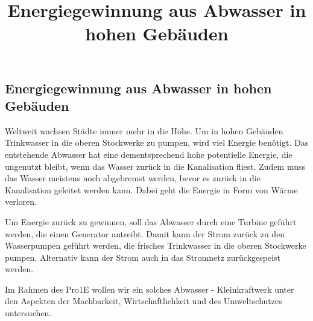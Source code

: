 \documentclass[12pt]{article}
\title{Energiegewinnung aus Abwasser in hohen Gebäuden}
\begin{document}
\subsection*{Energiegewinnung aus Abwasser in hohen Gebäuden}

Weltweit wachsen Städte immer mehr in die Höhe. Um in hohen Gebäuden Trinkwasser in die oberen Stockwerke zu pumpen, wird viel Energie benötigt. Das entstehende Abwasser hat eine dementsprechend hohe potentielle Energie, die ungenutzt bleibt, wenn das Wasser zurück in die Kanalisation fliest. Zudem muss das Wasser meistens noch abgebremst werden, bevor es zurück in die Kanalisation geleitet werden kann. Dabei geht die Energie in Form von Wärme verloren. 

Um Energie zurück zu gewinnen, soll das Abwasser durch eine Turbine geführt werden, die einen Generator antreibt. Damit kann der Strom zurück zu den Wasserpumpen geführt werden, die frisches Trinkwasser in die oberen Stockwerke pumpen. Alternativ kann der Strom auch in das Stromnetz zurückgespeist werden. 

Im Rahmen des Pro1E wollen wir ein solches Abwasser - Kleinkraftwerk unter den Aspekten der Machbarkeit, Wirtschaftlichkeit und des Umweltschutzes untersuchen.  
\end{document}
